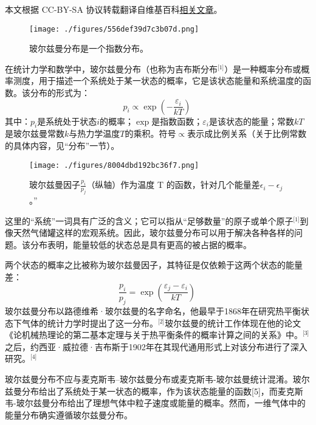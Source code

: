 
本文根据 CC-BY-SA 协议转载翻译自维基百科\href{https://en.wikipedia.org/wiki/Boltzmann_distribution}{相关文章}。

\begin{figure}[ht]
\centering
\texttt{[image: ./figures/556def39d7c3b07d.png]}
\caption{玻尔兹曼分布是一个指数分布。} \label{fig_BRCMLZ_1}
\end{figure}
在统计力学和数学中，玻尔兹曼分布（也称为吉布斯分布\(^\text{[1]}\)）是一种概率分布或概率测度，用于描述一个系统处于某一状态的概率，它是该状态能量和系统温度的函数。该分布的形式为：
\[
p_i \propto \exp\left(-\frac{\varepsilon_i}{kT}\right)~
\]
其中：\( p_i \)是系统处于状态\( i \)的概率；\( \exp \)是指数函数；\( \varepsilon_i \)是该状态的能量；常数\( kT \)是玻尔兹曼常数\( k \)与热力学温度\( T \)的乘积。符号\( \propto \)表示成比例关系（关于比例常数的具体内容，见“分布”一节）。
\begin{figure}[ht]
\centering
\texttt{[image: ./figures/8004dbd192bc36f7.png]}
\caption{玻尔兹曼因子\( \frac{p_i}{p_j} \)（纵轴）作为温度 T 的函数，针对几个能量差\( \epsilon_i - \epsilon_j \)。”} \label{fig_BRCMLZ_2}
\end{figure}
这里的“系统”一词具有广泛的含义；它可以指从“足够数量”的原子或单个原子\(^\text{[1]}\)到像天然气储罐这样的宏观系统。因此，玻尔兹曼分布可以用于解决各种各样的问题。该分布表明，能量较低的状态总是具有更高的被占据的概率。

两个状态的概率之比被称为玻尔兹曼因子，其特征是仅依赖于这两个状态的能量差：
\[
\frac{p_i}{p_j} = \exp\left(\frac{\varepsilon_j - \varepsilon_i}{kT}\right)~
\]
玻尔兹曼分布以路德维希·玻尔兹曼的名字命名，他最早于1868年在研究热平衡状态下气体的统计力学时提出了这一分布。\(^\text{[2]}\)玻尔兹曼的统计工作体现在他的论文《论机械热理论的第二基本定理与关于热平衡条件的概率计算之间的关系》中。\(^\text{[3]}\)之后，约西亚·威拉德·吉布斯于1902年在其现代通用形式上对该分布进行了深入研究。\(^\text{[4]}\)

玻尔兹曼分布不应与麦克斯韦–玻尔兹曼分布或麦克斯韦-玻尔兹曼统计混淆。玻尔兹曼分布给出了系统处于某一状态的概率，作为该状态能量的函数[5]，而麦克斯韦-玻尔兹曼分布给出了理想气体中粒子速度或能量的概率。然而，一维气体中的能量分布确实遵循玻尔兹曼分布。
